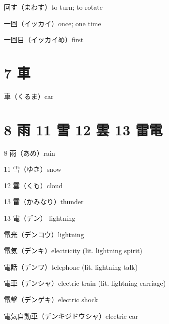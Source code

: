 回す（まわす）to turn; to rotate

一回（イッカイ）once; one time

一回目（イッカイめ）first

\section{7 車}

車（くるま）car

\section{8 雨 11 雪 12 雲 13 雷電}

8 雨（あめ）rain

11 雪（ゆき）snow

12 雲（くも）cloud

13 雷（かみなり）thunder

13 電（デン） lightning

電光（デンコウ）lightning

電気（デンキ）electricity (lit. lightning spirit)

電話（デンワ）telephone (lit. lightning talk)

電車（デンシャ）electric train (lit. lightning carriage)

電撃（デンゲキ）electric shock

電気自動車（デンキジドウシャ）electric car
